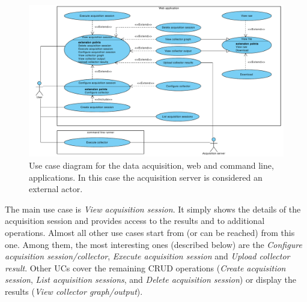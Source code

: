 \begin{figure}[p]
\begin{adjustwidth}{-1.95cm}{-2cm}
  \includegraphics[width=\linewidth]{images/uc-acquisition}
  \end{adjustwidth}

  \caption[Use case diagram for the data acquisition, web and command line, applications.]{Use case diagram for the data acquisition, web and command line, applications. In this case the acquisition server is considered an external actor.}
  \label{fig:uc-acquisition}
\end{figure}

The main use case is \emph{View acquisition session}. It simply shows the details of the acquisition session and provides access to the results and to additional operations. Almost all other use cases start from (or can be reached) from this one. Among them, the most interesting ones (described below) are the \emph{Configure acquisition session/collector}, \emph{Execute acquisition session} and \emph{Upload collector result}. Other UCs cover the remaining CRUD operations (\emph{Create acquisition session}, \emph{List acquisition sessions}, and \emph{Delete acquisition session}) or display the results (\emph{View collector graph/output}).

